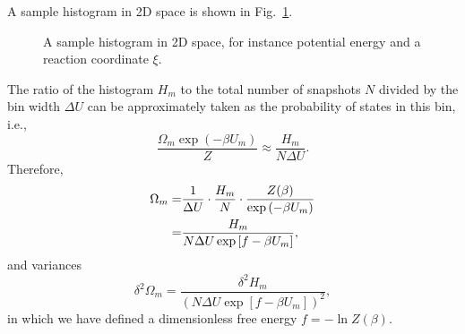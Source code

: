 A sample histogram in 2D space is shown in Fig.~\ref{Fig:FEM:WHAM:histogram}.
\begin{figure}[htbp]
	\centering
    \caption{A sample histogram in 2D space, for instance potential energy and a reaction coordinate $\xi$.}\label{Fig:FEM:WHAM:histogram}
\end{figure}

The ratio of the histogram $H_m$ to the total number of snapshots $N$ divided by the bin width $\Delta U$ can be approximately taken as the probability of states in this bin, i.e.,
\begin{equation}
	\frac{\Omega_m\exp{(-\beta U_m)}}{Z}\approx\frac{H_m}{N\Delta U}.
\end{equation}
Therefore,
\begin{align}
	\Omega_m=&\frac{1}{\Delta U}\cdot\frac{H_m}{N}\cdot\frac{Z(\beta)}{\exp{(-\beta U_m)}}\notag\\
	        =&\frac{H_m}{N\Delta U\exp{\left[f-\beta U_m\right]}},
	\label{Eq:FEM:WHAM:DoSsingle}
\end{align}
and variances
\begin{equation}
	\delta^2\Omega_m=\frac{\delta^2 H_m}{\left(N\Delta U\exp{\left[f-\beta U_m\right]}\right)^2},
\end{equation}
in which we have defined a dimensionless free energy $f=-\ln{Z(\beta)}$.

